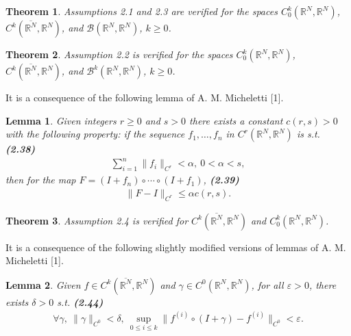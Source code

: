 \documentclass{book}
\numberwithin{equation}{section}
\newtheorem{lemma}{Lemma}[section]
\newtheorem{theorem}{Theorem}[section]
\begin{document}
\begin{enumerate}
\begin{enumerate}
        \begin{theorem}
            Assumptions 2.1 and 2.3 are verified for the spaces $C_0^k(\mathbb{R}^N,\mathbb{R}^N)$, $C^k(\overline{\mathbb{R}^N},\mathbb{R}^N)$, and $\mathcal{B}(\mathbb{R}^N,\mathbb{R}^N)$, $k\ge 0$.
        \end{theorem}
    
        \begin{theorem}
            Assumption 2.2 is verified for the spaces $C_0^k(\mathbb{R}^N,\mathbb{R}^N)$, $C^k(\overline{\mathbb{R}^N},\mathbb{R}^N)$, and $\mathcal{B}^k(\mathbb{R}^N,\mathbb{R}^N)$, $k\ge 0$.
        \end{theorem}
        It is a consequence of the following lemma of A. M. Micheletti [1].
        
        \begin{lemma}
            Given integers $r\ge 0$ and $s > 0$ there exists a constant $c(r,s) > 0$ with the following property: if the sequence $f_1,\ldots,f_n$ in $C^r(\mathbb{R}^N,\mathbb{R}^N)$ is s.t. \textbf{(2.38)}
            \begin{align*}
                \sum_{i=1}^n \|f_i\|_{C^r} < \alpha,\ 0 < \alpha < s,
            \end{align*}
            then for the map $F = (I + f_n)\circ\cdots\circ(I + f_1)$, \textbf{(2.39)}
            \begin{align*}
                \|F - I\|_{C^r}\le\alpha c(r,s).
            \end{align*}
        \end{lemma}
    
        \begin{theorem}
            Assumption 2.4 is verified for $C^k(\overline{\mathbb{R}^N},\mathbb{R}^N)$ and $C_0^k(\mathbb{R}^N,\mathbb{R}^N)$.
        \end{theorem}
        It is a consequence of the following slightly modified versions of lemmas of A. M. Micheletti [1].
        
        \begin{lemma}
            Given $f\in C^k(\overline{\mathbb{R}^N},\mathbb{R}^N)$ and $\gamma\in C^0(\mathbb{R}^N,\mathbb{R}^N)$, for all $\varepsilon > 0$, there exists $\delta > 0$ s.t. \textbf{(2.44)}
            \begin{align*}
                \forall\gamma,\ \|\gamma\|_{C^0} < \delta,\ \sup_{0\le i\le k} \|f^{(i)}\circ(I + \gamma) - f^{(i)}\|_{C^0} < \varepsilon.
            \end{align*}
        \end{lemma}
    

\end{enumerate}
\end{enumerate}
\end{document}
